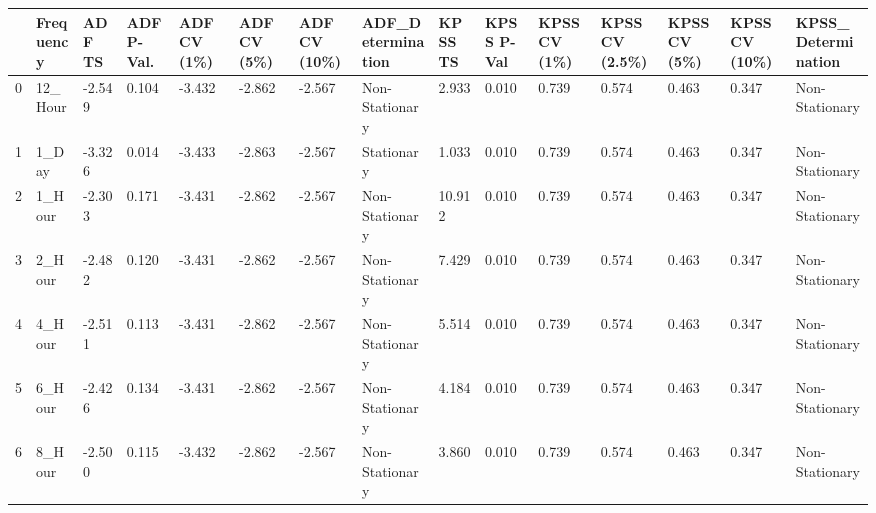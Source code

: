 \begin{tabular}{lllllllllllllll}
\toprule
 & Frequency & ADF TS & ADF P-Val. & ADF CV (1\%) & ADF CV (5\%) & ADF CV (10\%) & ADF_Determination & KPSS TS & KPSS P-Val & KPSS CV (1\%) & KPSS CV (2.5\%) & KPSS CV (5\%) & KPSS CV (10\%) & KPSS_Determination \\
\midrule
0 & 12_Hour & -2.549 & 0.104 & -3.432 & -2.862 & -2.567 & Non-Stationary & 2.933 & 0.010 & 0.739 & 0.574 & 0.463 & 0.347 & Non-Stationary \\
1 & 1_Day & -3.326 & 0.014 & -3.433 & -2.863 & -2.567 & Stationary & 1.033 & 0.010 & 0.739 & 0.574 & 0.463 & 0.347 & Non-Stationary \\
2 & 1_Hour & -2.303 & 0.171 & -3.431 & -2.862 & -2.567 & Non-Stationary & 10.912 & 0.010 & 0.739 & 0.574 & 0.463 & 0.347 & Non-Stationary \\
3 & 2_Hour & -2.482 & 0.120 & -3.431 & -2.862 & -2.567 & Non-Stationary & 7.429 & 0.010 & 0.739 & 0.574 & 0.463 & 0.347 & Non-Stationary \\
4 & 4_Hour & -2.511 & 0.113 & -3.431 & -2.862 & -2.567 & Non-Stationary & 5.514 & 0.010 & 0.739 & 0.574 & 0.463 & 0.347 & Non-Stationary \\
5 & 6_Hour & -2.426 & 0.134 & -3.431 & -2.862 & -2.567 & Non-Stationary & 4.184 & 0.010 & 0.739 & 0.574 & 0.463 & 0.347 & Non-Stationary \\
6 & 8_Hour & -2.500 & 0.115 & -3.432 & -2.862 & -2.567 & Non-Stationary & 3.860 & 0.010 & 0.739 & 0.574 & 0.463 & 0.347 & Non-Stationary \\
\bottomrule
\end{tabular}
